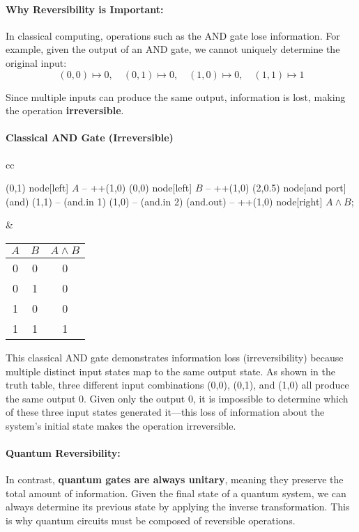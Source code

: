 \paragraph{Why Reversibility is Important:}
In classical computing, operations such as the AND gate lose information.
For example, given the output of an AND gate, we cannot uniquely determine
the original input:
\[
  (0,0) \mapsto 0, \quad (0,1) \mapsto 0, \quad (1,0) \mapsto 0, \quad
  (1,1) \mapsto 1
\]

Since multiple inputs can produce the same output, information is lost,
making the operation \textbf{irreversible}.

\paragraph{Classical AND Gate (Irreversible)}
\begin{center}
  \begin{tabular}{cc}
    \begin{circuitikz} \draw
      (0,1) node[left] {$A$} -- ++(1,0)
      (0,0) node[left] {$B$} -- ++(1,0)
      (2,0.5) node[and port] (and) {}
      (1,1) -- (and.in 1)
      (1,0) -- (and.in 2)
      (and.out) -- ++(1,0) node[right] {$A \land B$};
    \end{circuitikz}
    &
    \begin{tabular}{|c|c|c|}
      \hline
      $A$ & $B$ & $A \land B$ \\
      \hline
      0 & 0 & 0 \\
      0 & 1 & 0 \\
      1 & 0 & 0 \\
      1 & 1 & 1 \\
      \hline
    \end{tabular}
  \end{tabular}
\end{center}

\noindent This classical AND gate demonstrates information loss
(irreversibility) because multiple distinct input states map to the same
output state. As shown in the truth table, three different input
combinations (0,0), (0,1), and (1,0) all produce the same output 0. Given
only the output 0, it is impossible to determine which of these three input
states generated it—this loss of information about the system's initial
state makes the operation irreversible.

\paragraph{Quantum Reversibility:}
In contrast, \textbf{quantum gates are always unitary}, meaning they
preserve the total amount of information. Given the final state of a
quantum system, we can always determine its previous state by applying the
inverse transformation. This is why quantum circuits must be composed of
reversible operations.

